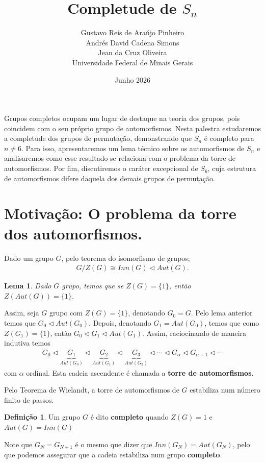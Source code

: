 \documentclass{article}
\title{Completude de $S_n$}
\author{Gustavo Reis de Araújo Pinheiro\\Andrés David Cadena Simons\\
Jean da Cruz Oliveira\\
\large Universidade Federal de Minais Gerais}
\date{Junho 2026}
\newtheorem{lemma}[theorem]{Lema}
\theoremstyle{definition}
\newtheorem{definition}[theorem]{Definição}
\theoremstyle{remark}
\begin{document}
\maketitle
    Grupos completos ocupam um lugar de destaque na teoria dos grupos, pois coincidem com o seu próprio grupo de automorfismos. Nesta palestra estudaremos a completude dos grupos de permutação, demonstrando que $S_n$ é completo para $n\neq 6$. Para isso, apresentaremos um lema técnico sobre os automorfismos de $S_n$ e analisaremos como esse resultado se relaciona com o problema da torre de automorfismos. Por fim, discutiremos o caráter excepcional de $S_6$, cuja estrutura de automorfismos difere daquela dos demais grupos de permutação.
\section{Motivação: O problema da torre dos automorfismos.}
Dado um grupo $G$, pelo teorema do isomorfismo de grupos; 
  \begin{align*}
      G/Z(G)\cong Inn(G) \lhd Aut(G).
    \end{align*}
    \begin{lemma}
         Dado $G$ grupo, temos que se $Z(G)=\{1\}$, então $Z(Aut(G))=\{1\}$.
    \end{lemma}
   Assim, seja $G$ grupo com $Z(G)=\{1\}$, denotando $G_0=G$. Pelo lema anterior temos que $G_0\lhd Aut(G_0)$. Depois, denotando $G_1=Aut(G_0)$, temos que como $Z(G_1)=\{1\}$, então $G_0\lhd G_1\lhd Aut(G_1)$. Assim, raciocinando de maneira indutiva temos
    \begin{align*}
      G_0\lhd \underbrace{G_1}_{Aut(G_0)}\lhd \underbrace{G_2}_{Aut(G_1)}\lhd\underbrace{G_3}_{Aut(G_2)}\lhd\cdots\lhd G_{\alpha}\lhd G_{\alpha+1}\lhd\cdots
    \end{align*}
    com $\alpha$ ordinal.  Esta cadeia ascendente é chamada a \textbf{torre de automorfismos}.

    Pelo Teorema de Wielandt, a torre de automorfismos de $G$ estabiliza num número finito de passos. 

    \begin{definition}
        Um grupo $G$ é dito \textbf{completo} quando $Z(G) = 1$ e $Aut(G) = Inn(G)$
    \end{definition}
Note que $G_{N}=G_{N+1}$ é o mesmo que dizer que $Inn(G_N)=Aut(G_{N})$, pelo que podemos assegurar que a cadeia estabiliza num grupo \textbf{completo}.
\end{document}
